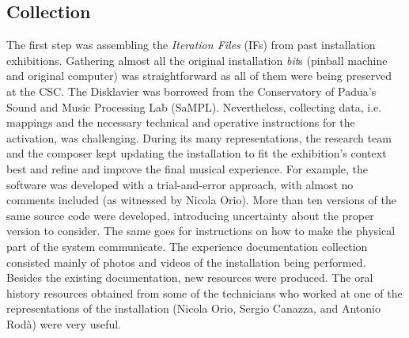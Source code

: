 \subsection*{Collection}
The first step was assembling the \textit{Iteration Files} (IFs) from past installation exhibitions. Gathering almost all the original installation \textit{bit}s (pinball machine and original computer) was straightforward as all of them were being preserved at the CSC. The Disklavier was borrowed from the Conservatory of Padua's Sound and Music Processing Lab (SaMPL). Nevertheless, collecting data, i.e. mappings and the necessary technical and operative instructions for the activation, was challenging. During its many representations, the research team and the composer kept updating the installation to fit the exhibition’s context best and refine and improve the final musical experience. For example, the software was developed with a trial-and-error approach, with almost no comments included (as witnessed by Nicola Orio). More than ten versions of the same source code were developed, introducing uncertainty about the proper version to consider. The same goes for instructions on how to make the physical part of the system communicate. The experience documentation collection consisted mainly of photos and videos of the installation being performed. Besides the existing documentation, new resources were produced. The oral history resources obtained from some of the technicians who worked at one of the representations of the installation (Nicola Orio, Sergio Canazza, and Antonio Rodà) were very useful.

